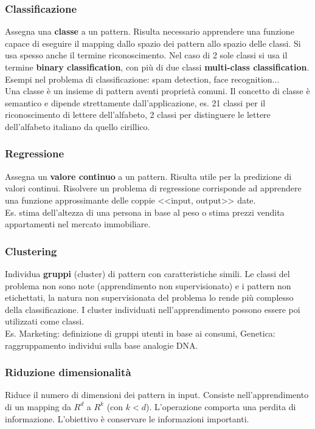 \documentclass{article}
\begin{document}
\subsubsection{Classificazione}
Assegna una \textbf{classe} a un pattern. Risulta necessario apprendere una funzione capace di eseguire il mapping dallo spazio dei pattern allo spazio delle classi. Si usa spesso anche il termine riconoscimento. Nel caso di 2 sole classi si usa il termine \textbf{binary classification}, con più di due classi \textbf{multi-class classification}.\\
Esempi nel problema di classificazione: spam detection, face recognition...
\\Una classe è un insieme di pattern aventi proprietà comuni. Il concetto di classe è semantico e dipende strettamente dall'applicazione, es. 21 classi per il riconoscimento di lettere dell'alfabeto, 2 classi per distinguere le lettere dell'alfabeto italiano da quello cirillico.
\subsubsection{Regressione}
Assegna un \textbf{valore continuo} a un pattern. Risulta utile per la predizione di valori continui. Risolvere un problema di regressione corrisponde ad apprendere una funzione approssimante delle coppie <<input, output>> date.\\
Es. stima dell'altezza di una persona in base al peso o stima prezzi vendita appartamenti nel mercato immobiliare.
\subsubsection{Clustering}
Individua \textbf{gruppi} (cluster) di pattern con caratteristiche simili. Le classi del problema non sono note (apprendimento non supervisionato) e i pattern non etichettati, la natura non supervisionata del problema lo rende più complesso della classificazione. I cluster individuati nell'apprendimento possono essere poi utilizzati come classi.\\
Es. Marketing: definizione di gruppi utenti in base ai consumi, Genetica: raggruppamento individui sulla base analogie DNA.
\subsubsection{Riduzione dimensionalità}
Riduce il numero di dimensioni dei pattern in input. Consiste nell'apprendimento di un mapping da $R^d$ a $R^k$ (con $k<d$). L'operazione comporta una perdita di informazione. L'obiettivo è conservare le informazioni importanti. 
\end{document}
